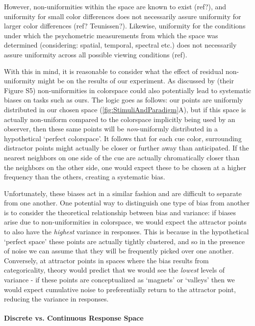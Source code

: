 However, non-uniformities within the space are known to exist (ref?), and uniformity for small color differences does not necessarily assure uniformity for larger color differences (ref? Teunissen?). Likewise, uniformity for the conditions under which the psychometric measurements from which the space was determined (considering: spatial, temporal, spectral etc.) does not necessarily assure uniformity across all possible viewing conditions (ref).

With this in mind, it is reasonable to consider what the effect of residual non-uniformity might be on the results of our experiment. As discussed by \cite{panichello_error-correcting_2019} (their Figure S5) non-uniformities in colorspace could also potentially lead to systematic biases on tasks such as ours. The logic goes as follows: our points are uniformly distributed in our chosen space (\autoref{fig:StimuliAndParadigm}A), but if this space is actually non-uniform compared to the colorspace implicitly being used by an observer, then these same points will be \emph{non}-uniformly distributed in a hypothetical `perfect colorspace'. It follows that for each cue color, surrounding distractor points might actually be closer or further away than anticipated. If the nearest neighbors on one side of the cue are actually chromatically closer than the neighbors on the other side, one would expect these to be chosen at a higher frequency than the others, creating a systematic bias.

Unfortunately, these biases act in a similar fashion and are difficult to separate from one another. One potential way to distinguish one type of bias from another is to consider the theoretical relationship between bias and variance: if biases arise due to non-uniformities in colorspace, we would expect the attractor points to also have the \emph{highest} variance in responses. This is because in the hypothetical `perfect space' these points are actually tightly clustered, and so in the presence of noise we can assume that they will be frequently picked over one another. Conversely, at attractor points in spaces where the bias results from categoricality, theory would predict that we would see the \emph{lowest} levels of variance - if these points are conceptualized as `magnets' or `valleys' then we would expect cumulative noise to preferentially return to the attractor point, reducing the variance in responses.



\paragraph{Discrete vs. Continuous Response Space}
